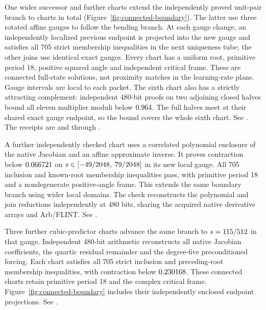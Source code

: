 \documentclass[11pt,letterpaper]{article}
\begin{document}
One wider successor and \nPALRotatedCharts{} further charts extend the independently proved
unit-pair branch to \nPALTotalCharts{} charts in total (Figure~\ref{fig:connected-boundary}).
The latter use three rotated affine gauges to follow the bending branch. At each gauge change,
an independently localized previous endpoint is projected into the new gauge and satisfies
all 705 strict membership inequalities in the next uniqueness tube; the other joins use identical
exact gauges. Every chart has a uniform root, primitive period 18, positive squared angle and
independent critical frame. These are connected full-state solutions, not proximity matches in
the learning-rate plane. Gauge intervals are local to each packet. The sixth chart also has a strictly attracting complement: independent 480-bit
proofs on two adjoining closed halves bound all eleven multiplier moduli below
$0.964$. The full halves meet at their shared exact gauge
endpoint, so the bound covers the whole sixth chart. See
.
The receipts are  and
 through
.

A further independently checked chart uses a correlated polynomial enclosure of the native
Jacobian and an affine approximate inverse. It proves contraction below
$0.066721$ on $s\in[-49/2048,\;79/2048]$ in its new local gauge.
All 705 inclusion and known-root membership inequalities pass, with primitive period 18 and
a nondegenerate positive-angle frame. This extends the same boundary branch using wider local
domains. The check reconstructs the polynomial and join reductions independently at 480 bits,
sharing the acquired native derivative arrays and Arb/FLINT. See
.

Three further cubic-predictor charts advance the same branch to
$s=115/512$ in that gauge. Independent 480-bit arithmetic reconstructs
all native Jacobian coefficients, the quartic residual remainder and the degree-five
preconditioned forcing. Each chart satisfies all 705 strict inclusion and preceding-root
membership inequalities, with contraction below $0.230168$.
These \nPALCubicCharts{} connected charts retain primitive period 18 and the complex
critical frame. Figure~\ref{fig:connected-boundary} includes their independently enclosed
endpoint projections. See .
\end{document}
